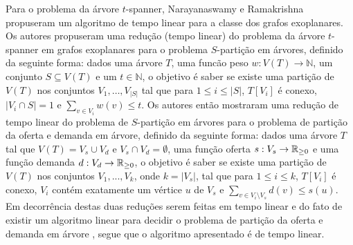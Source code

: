 Para o problema da árvore $t$-spanner, Narayanaswamy e Ramakrishna~\cite{NarayanaswamyR2015} propuseram um algoritmo de tempo linear para a classe dos grafos exoplanares. Os autores propuseram uma redução (tempo linear) do problema da árvore $t$-spanner em grafos exoplanares para o problema $S$-partição em árvores, definido da seguinte forma: dados uma árvore $T$, uma funcão peso $w: V(T) \rightarrow \mathbb{N}$, um conjunto $S \subseteq V(T)$ e um $t \in \mathbb{N}$, o objetivo é saber se existe uma partição de $V(T)$ nos conjuntos $V_1, \ldots, V_{|S|}$ tal que para $1 \le i \le |S|$, $T[V_i]$ é conexo, $|V_i \cap S| = 1$ e $\sum_{v \in V_i} w(v) \le t$. Os autores então mostraram uma redução de tempo linear do problema de $S$-partição em árvores para o problema de partição da oferta e demanda em árvore, definido da seguinte forma: dados uma árvore $T$ tal que $V(T) = V_s \cup V_d$ e $V_s \cap V_d = \emptyset$, uma função oferta $s: V_s \rightarrow \mathbb{R}_{\ge 0}$ e uma função demanda $d: V_d \rightarrow \mathbb{R}_{\ge 0}$, o objetivo é saber se existe uma partição de $V(T)$ nos conjuntos $V_1, ..., V_k$, onde $k = |V_s|$, tal que para $1 \le i \le k$, $T[V_i]$ é conexo, $V_i$ contém exatamente um vértice $u$ de $V_s$ e $\sum_{v \in V_i \setminus V_s} d(v) \le s(u)$. Em decorrência destas duas reduções serem feitas em tempo linear e do fato de existir um algoritmo linear para decidir o problema de partição da oferta e demanda em árvore \cite{ItoZN2002}, segue que o algoritmo apresentado é de tempo linear.

